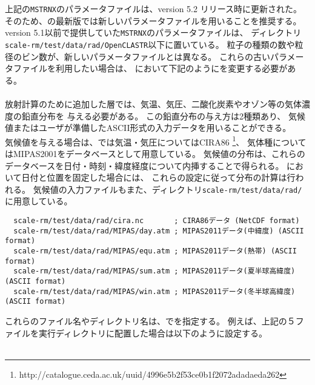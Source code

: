 上記の\verb|MSTRNX|のパラメータファイルは、version 5.2 リリース時に更新された。
そのため、{\scalerm}の最新版では新しいパラメータファイルを用いることを推奨する。
version 5.1以前で提供していた\verb|MSTRNX|のパラメータファイルは、
ディレクトリ\verb|scale-rm/test/data/rad/OpenCLASTR|以下に置いている。
粒子の種類の数や粒径のビン数が、新しいパラメータファイルとは異なる。
これらの古いパラメータファイルを利用したい場合は、
において下記のようにを変更する必要がある。\\

\\

放射計算のために追加した層では、気温、気圧、二酸化炭素やオゾン等の気体濃度の鉛直分布を
与える必要がある。
この鉛直分布の与え方は2種類あり、
気候値またはユーザが準備したASCII形式の入力データを用いることができる。\\

気候値を与える場合は、\scalerm では気温・気圧についてはCIRA86
\footnote{http://catalogue.ceda.ac.uk/uuid/4996e5b2f53ce0b1f2072adadaeda262}\citep{CSR_2006}、
気体種についてはMIPAS2001\citep{Remedios_2007}をデータベースとして用意している。
気候値の分布は、これらのデータベースを日付・時刻・緯度経度について内挿することで得られる。
において日付と位置を固定した場合には、
これらの設定に従って分布の計算は行われる。
気候値の入力ファイルもまた、ディレクトリ\verb|scale-rm/test/data/rad/|に用意している。
\begin{verbatim}
  scale-rm/test/data/rad/cira.nc       ; CIRA86データ (NetCDF format)
  scale-rm/test/data/rad/MIPAS/day.atm ; MIPAS2011データ(中緯度) (ASCII format)
  scale-rm/test/data/rad/MIPAS/equ.atm ; MIPAS2011データ(熱帯) (ASCII format)
  scale-rm/test/data/rad/MIPAS/sum.atm ; MIPAS2011データ(夏半球高緯度) (ASCII format)
  scale-rm/test/data/rad/MIPAS/win.atm ; MIPAS2011データ(冬半球高緯度) (ASCII format)
\end{verbatim}
これらのファイル名やディレクトリ名は、でを指定する。
例えば、上記の５ファイルを実行ディレクトリに配置した場合は以下のように設定する。\\

\\

